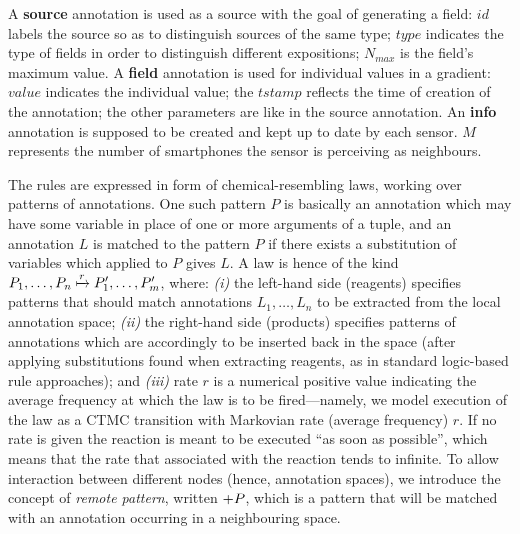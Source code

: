 \documentclass[12pt,a4paper,twoside,openright]{book}
\begin{document}
\noindent A \textbf{source} annotation is used as a source with the goal of generating a field: $id$ labels the source so as to distinguish sources of the same type; $type$ indicates the type of fields in order to distinguish different expositions; $N_{max}$ is the field's maximum value. 
%
A \textbf{field} annotation is used for individual values in a gradient: $value$ indicates the individual value; the $tstamp$ reflects the time of creation of the annotation; the other parameters are like in the source annotation.
%
An \textbf{info} annotation is supposed to be created and kept up to date by each sensor. $M$ represents the number of smartphones the sensor is perceiving as neighbours.

The rules are expressed in form of chemical-resembling laws, working over patterns of annotations.
%
One such pattern $P$ is basically an annotation which may have some variable in place of one or more arguments of a tuple, and an annotation $L$ is matched to the pattern $P$ if there exists a substitution of variables which applied to $P$ gives $L$.
%
A law is hence of the kind \mbox{$P_1,\ldots,P_n\xmapsto{r}P'_1,\ldots,P'_m$}, where: \emph{(i)} the left-hand side (reagents) specifies patterns that should match annotations $L_1,\ldots,L_n$ to be extracted from the local annotation space; \emph{(ii)} the right-hand side (products) specifies patterns of annotations which are accordingly to be inserted back in the space (after applying substitutions found when extracting reagents, as in standard logic-based rule approaches); and \emph{(iii)} rate $r$ is a numerical positive value indicating the average frequency at which the law is to be fired---namely, we model execution of the law as a CTMC transition with Markovian rate (average frequency) $r$. If no rate is given the reaction is meant to be executed ``as soon as possible'', which means that the rate that associated with the reaction tends to infinite.
%
To allow interaction between different nodes (hence, annotation spaces), we introduce the concept of \emph{remote pattern}, written $+P$, which is a pattern that will be matched with an annotation occurring in a neighbouring space.
\end{document}
